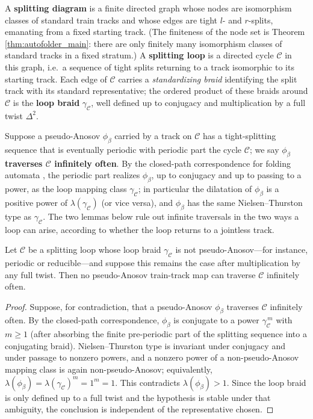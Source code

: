 A \textbf{splitting diagram} is a finite directed graph whose nodes are isomorphism classes of standard train tracks and whose edges are tight $l$- and $r$-splits, emanating from a fixed starting track. (The finiteness of the node set is Theorem \ref{thm:autofolder_main}: there are only finitely many isomorphism classes of standard tracks in a fixed stratum.) A \textbf{splitting loop} is a directed cycle $\mathcal{C}$ in this graph, i.e.\ a sequence of tight splits returning to a track isomorphic to its starting track. Each edge of $\mathcal{C}$ carries a \emph{standardizing braid} identifying the split track with its standard representative; the ordered product of these braids around $\mathcal{C}$ is the \textbf{loop braid} $\gamma_{\mathcal{C}}$, well defined up to conjugacy and multiplication by a full twist $\Delta^2$.

Suppose a pseudo-Anosov $\phi_\beta$ carried by a track on $\mathcal{C}$ has a tight-splitting sequence that is eventually periodic with periodic part the cycle $\mathcal{C}$; we say $\phi_\beta$ \textbf{traverses $\mathcal{C}$ infinitely often}. By the closed-path correspondence for folding automata \cite{Los2008}, the periodic part realizes $\phi_\beta$, up to conjugacy and up to passing to a power, as the loop mapping class $\gamma_{\mathcal{C}}$; in particular the dilatation of $\phi_\beta$ is a positive power of $\lambda(\gamma_{\mathcal{C}})$ (or vice versa), and $\phi_\beta$ has the same Nielsen--Thurston type as $\gamma_{\mathcal{C}}$. The two lemmas below rule out infinite traversals in the two ways a loop can arise, according to whether the loop returns to a jointless track.

\begin{lemma}
\label{lem:periodic_loop}
Let $\mathcal{C}$ be a splitting loop whose loop braid $\gamma_{\mathcal{C}}$ is not pseudo-Anosov---for instance, periodic or reducible---and suppose this remains the case after multiplication by any full twist. Then no pseudo-Anosov train-track map can traverse $\mathcal{C}$ infinitely often.
\end{lemma}

\begin{proof}
Suppose, for contradiction, that a pseudo-Anosov $\phi_\beta$ traverses $\mathcal{C}$ infinitely often. By the closed-path correspondence, $\phi_\beta$ is conjugate to a power $\gamma_{\mathcal{C}}^{\,m}$ with $m \ge 1$ (after absorbing the finite pre-periodic part of the splitting sequence into a conjugating braid). Nielsen--Thurston type is invariant under conjugacy and under passage to nonzero powers, and a nonzero power of a non-pseudo-Anosov mapping class is again non-pseudo-Anosov; equivalently, $\lambda(\phi_\beta) = \lambda(\gamma_{\mathcal{C}})^{m} = 1^{m} = 1$. This contradicts $\lambda(\phi_\beta) > 1$. Since the loop braid is only defined up to a full twist and the hypothesis is stable under that ambiguity, the conclusion is independent of the representative chosen.
\end{proof}

